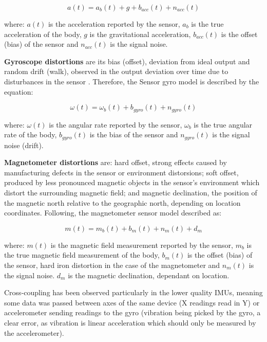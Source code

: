 \begin{equation}\label{accmodel}
	{a}(t)={a_b}(t)+g+b_{acc}(t)+n_{acc}(t)
\end{equation}

where: ${a}(t) $ is the acceleration reported by the sensor, $ a_b $ is the true acceleration of the body, $g$ is the gravitational acceleration, $b_{acc}(t)$ is the offset (bias) of the sensor and $n_{acc}(t)$ is the signal noise.


\textbf{Gyroscope distortions} are its bias (offset), deviation from ideal output
and random drift (walk), observed in the output deviation over time due to disturbances in the sensor \cite{lawrence1998gyro}. Therefore, the Sensor gyro model is described by the equation:

\begin{equation}\label{gyromodel}
	{\omega}(t)={\omega_b}(t)+b_{gyro}(t)+n_{gyro}(t)
\end{equation}

where: ${\omega}(t) $ is the angular rate reported by the sensor, $ {\omega_b} $ is the true angular rate  of the body, $b_{gyro}(t)$ is the bias of the sensor and $n_{gyro}(t)$ is the signal noise (drift). \cite{euston2008complementary}

\textbf{Magnetometer distortions} are: hard offset, strong effects caused by manufacturing defects in the sensor or environment distorsions; soft offset, produced by less pronounced magnetic objects in the sensor’s environment which distort the surrounding magnetic field; and magnetic declination, the position of the magnetic north relative to the geographic north, depending on location coordinates. Following, the magnetometer sensor model described as:

 \begin{equation}\label{magmodel}
	{m}(t)={m_b}(t)+b_{m}(t)+n_{m}(t)+d_m
\end{equation}
 
 where: ${m}(t) $ is the magnetic field measurement reported by the sensor, $ {m_b} $ is the true magnetic field measurement of the body, $b_{m}(t)$ is the offset (bias) of the sensor, hard iron distortion in the case of the magnetometer and $n_{m}(t)$ is the signal noise. $ d_m$ is the magnetic declination, dependant on location. 

Cross-coupling has been observed particularly in the lower quality IMUs, meaning some data was passed between axes of the same device (X readings read in Y) or accelerometer sending readings to the gyro (vibration being picked by the gyro, a clear error, as vibration is linear acceleration which should only be measured by the accelerometer).
 
